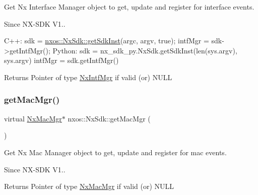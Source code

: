 Get Nx Interface Manager object to get, update and register for interface events.

\begin{DoxySince}{Since}
N\+X-\/\+S\+DK V1..
\end{DoxySince}

\begin{DoxyCode}
C++:
       sdk = \mbox{\hyperlink{classnxos_1_1_nx_sdk_a5050e2d26c40744b4fc7862068a83f39}{nxos::NxSdk::getSdkInst}}(argc, argv, \textcolor{keyword}{true});
       intfMgr = sdk->getIntfMgr();
Python:
       sdk = nx\_sdk\_py.NxSdk.getSdkInst(len(sys.argv), sys.argv)
       intfMgr = sdk.getIntfMgr()
\end{DoxyCode}


\begin{DoxyReturn}{Returns}
Pointer of type \mbox{\hyperlink{classnxos_1_1_nx_intf_mgr}{Nx\+Intf\+Mgr}} if valid (or) N\+U\+LL 
\end{DoxyReturn}
\mbox{\label{classnxos_1_1_nx_sdk_adfa969f547080efd92f90f55ebc930c5}} 
\subsubsection{\texorpdfstring{get\+Mac\+Mgr()}{getMacMgr()}}
{\footnotesize\ttfamily virtual \mbox{\hyperlink{classnxos_1_1_nx_mac_mgr}{Nx\+Mac\+Mgr}}$\ast$ nxos\+::\+Nx\+Sdk\+::get\+Mac\+Mgr (\begin{DoxyParamCaption}{ }\end{DoxyParamCaption})\hspace{0.3cm}{\ttfamily [pure virtual]}}

Get Nx Mac Manager object to get, update and register for mac events.

\begin{DoxySince}{Since}
N\+X-\/\+S\+DK V1..
\end{DoxySince}
\begin{DoxyReturn}{Returns}
Pointer of type \mbox{\hyperlink{classnxos_1_1_nx_mac_mgr}{Nx\+Mac\+Mgr}} if valid (or) N\+U\+LL 
\end{DoxyReturn}
\mbox{\label{classnxos_1_1_nx_sdk_a3cdb42126b1132cf9aa00426a8d5d428}} 
